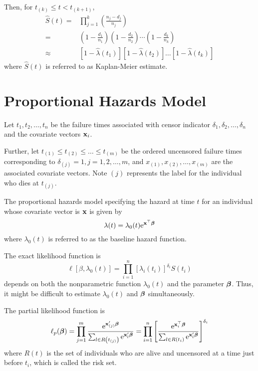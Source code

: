 Then, for $t_{(k)}\leq t<t_{(k+1)}$,
\begin{equation}
	\begin{aligned}
		\hat{S}(t)= & \prod_{j=1}^{k}\left(\frac{n_{j}-d_{j}}{n_{j}}\right)                                                                                             \\
		=           & \left(1-\frac{d_{1}}{n_{1}}\right)\left(1-\frac{d_{2}}{n_{2}}\right) \cdots\left(1-\frac{d_{k}}{n_{k}}\right)                                     \\
		\approx     & \left[1-\hat{\lambda}\left(t_{1}\right)\right]\left[1-\hat{\lambda}\left(t_{2}\right)\right] \ldots\left[1-\hat{\lambda}\left(t_{k}\right)\right]
	\end{aligned}
\end{equation}
where $\hat{S}(t)$ is referred to as Kaplan-Meier estimate.

\section{Proportional Hazards Model}

Let $t_{1},t_{2},\ldots,t_{n}$ be the failure times associated with censor indicator $\delta_{1},\delta_{2},\ldots,\delta_{n}$ and the covariate vectors ${\bf x}_{i}$.

Further, let $t_{(1)}\leq t_{(2)}\leq\ldots\leq t_{(m)}$ be the ordered uncensored failure times corresponding to $\delta_{(j)}=1,j=1,2,\ldots,m$, and $x_{(1)},x_{(2)},\ldots,x_{(m)}$ are the associated covariate vectors. Note $(j)$ represents the label for the individual who dies at $t_{(j)}$.

The proportional hazards model specifying the hazard at time $t$ for an individual whose covariate vector is ${\bf x}$ is given by
\begin{equation}
	\lambda(t)=\lambda_{0}(t)\mathrm{e}^{{\bf x}^{\top}\boldsymbol{\beta}}
\end{equation}
where $\lambda_{0}(t)$ is referred to as the baseline hazard function.

The exact likelihood function is
\begin{equation}
	\ell\left[\beta,\lambda_{0}(t)\right]=\prod_{i=1}^{n}\left[\lambda_{i}\left(t_{i}\right)\right]^{\delta_{i}}S\left(t_{i}\right)
\end{equation}
depends on both the nonparametric function $\lambda_{0}(t)$ and the parameter $\boldsymbol{\beta}$. Thus, it might be difficult to estimate $\lambda_{0}(t)$ and $\boldsymbol{\beta}$ simultaneously.

The partial likelihood function is
\begin{equation}
	\ell_{p}(\boldsymbol{\beta})=\prod_{j=1}^{m}\frac{\mathrm{e}^{{\bf x}_{(j)}^{\prime}\boldsymbol{\beta}}}{\sum_{l\in R\left(t_{(j)}\right)}\mathrm{e}^{{\bf x}_{l}^{\prime}\boldsymbol{\beta}}}=\prod_{i=1}^{n}\left[\frac{\mathrm{e}^{{\bf x}_{i}^{\top}\boldsymbol{\beta}}}{\sum_{l\in R\left(t_{i}\right)}\mathrm{e}^{{\bf x}_{l}^{\prime}\boldsymbol{\beta}}}\right]^{\delta_{i}}
\end{equation}
where $R(t)$ is the set of individuals who are alive and uncensored at a time just before $t_{i}$, which is called the risk set.

